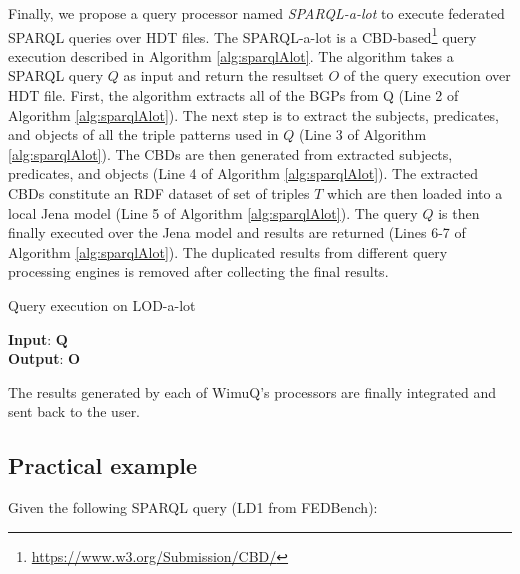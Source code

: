 Finally, we propose a query processor named \emph{SPARQL-a-lot} to execute federated SPARQL queries over HDT files. The SPARQL-a-lot is a CBD-based\footnote{\label{cbd}\url{https://www.w3.org/Submission/CBD/}} query execution described in Algorithm \ref{alg:sparqlAlot}. The algorithm takes a SPARQL query $Q$ as input and return the resultset $O$ of the query execution over HDT file. First, the algorithm extracts all of the BGPs from Q (Line 2 of Algorithm \ref{alg:sparqlAlot}). The next step is to extract the subjects, predicates, and objects of all the triple patterns used in $Q$ (Line 3 of Algorithm \ref{alg:sparqlAlot}). The CBDs are then generated from extracted subjects, predicates, and objects (Line 4 of Algorithm \ref{alg:sparqlAlot}). The extracted CBDs constitute an RDF dataset of set of triples $T$ which are then loaded into a local Jena model (Line 5 of Algorithm \ref{alg:sparqlAlot}). The query $Q$ is then finally executed over the Jena model and results are returned (Lines 6-7 of Algorithm \ref{alg:sparqlAlot}). The duplicated results from different query processing engines is removed after collecting the final results. 


\begin{algorithm} [htb] 
	\caption{Query execution on LOD-a-lot}
	\label{alg:sparqlAlot}
    	\textbf{Input}: $\mathbf{Q}$  \\
    	\textbf{Output}: $\mathbf{O}$ 
    	\begin{algorithmic}[1]    		
        		  
        		 
    		\EndProcedure
    	\end{algorithmic}
\end{algorithm}

The results generated by each of WimuQ's processors are finally integrated and sent back to the user. 

 \subsection{Practical example}
 Given the following SPARQL query (LD1 from FEDBench\cite{fedbench2011}):

